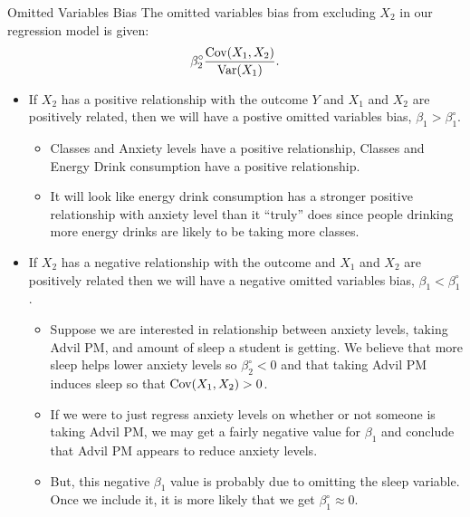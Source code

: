 \documentclass[notheorems, 9pt, handout]{beamer}
\begin{document}
\begin{frame}{Omitted Variables Bias} %
	\label{frame:omitted3} %
	\onslide<1->
	The omitted variables bias from excluding \(X_2\) in our regression model is given:
	\[
		\beta_2^\circ\frac{\operatorname{Cov}(X_1,X_2)}{\operatorname{Var}(X_1)} 
	.\]
	\begin{itemize}
		\item<1|only@1> If \(X_2\) has a positive relationship with the outcome \(Y\) and  \(X_1\) and  \(X_2\) are positively related, then we will have a postive omitted variables bias, \(\beta_1 > \beta_1^\circ\).
		\begin{itemize}
			\item Classes and Anxiety levels have a positive relationship, Classes and Energy Drink consumption have a positive relationship.
		    \item It will look like energy drink consumption has a stronger positive relationship with anxiety level than it ``truly'' does since people drinking more energy drinks are likely to be taking more classes.
		\end{itemize}
		\item<2|only@2> If \(X_2\) has a negative relationship with the outcome and  \(X_1\) and  \(X_2\) are positively related then we will have a negative omitted variables bias,  \(\beta_1 < \beta_1^\circ\).
		\begin{itemize}
			\item Suppose we are interested in relationship between anxiety levels, taking Advil PM, and amount of sleep a student is getting. We believe that more sleep helps lower anxiety levels so \(\beta_2^\circ < 0\) and that taking Advil PM induces sleep so that \(\operatorname{Cov}(X_1,X_2) > 0\).
			\item If we were to just regress anxiety levels on whether or not someone is taking Advil PM, we may get a fairly negative value for \(\beta_1\) and conclude that Advil PM appears to reduce anxiety levels.
		    \item But, this negative \(\beta_1\) value is probably due to omitting the sleep variable. Once we include it, it is more likely that we get \(\beta_1^\circ \approx 0\).
		\end{itemize}
	\end{itemize}
\end{frame}
\end{document}

